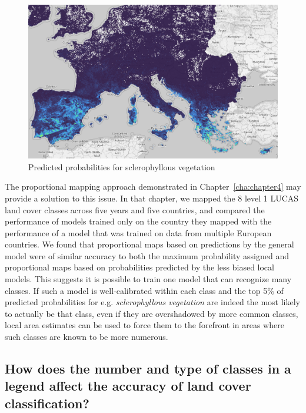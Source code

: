         \begin{figure}[H]
            \centering
            \includegraphics[width=1\linewidth]{figs_06/sclerophyllous.png}
            \caption{Predicted probabilities for sclerophyllous vegetation}
            \label{fig:sclerophyllous}
        \end{figure}
        
        The proportional mapping approach demonstrated in Chapter\@~\ref{cha:chapter4} may provide a solution to this issue. In that chapter, we mapped the 8 level 1 LUCAS land cover classes across five years and five countries, and compared the performance of models trained only on the country they mapped with the performance of a model that was trained on data from multiple European countries. We found that proportional maps based on predictions by the general model were of similar accuracy to both the maximum probability assigned and proportional maps based on probabilities predicted by the less biased local models. This suggests it is possible to train one model that can recognize many classes. If such a model is well-calibrated within each class and the top 5\% of predicted probabilities for e.g. \textit{sclerophyllous vegetation} are indeed the most likely to actually be that class, even if they are overshadowed by more common classes, local area estimates can be used to force them to the forefront in areas where such classes are known to be more numerous. 
        

    \subsection{How does the number and type of classes in a legend affect the accuracy of land cover classification?}
    \label{syn:rq3}

